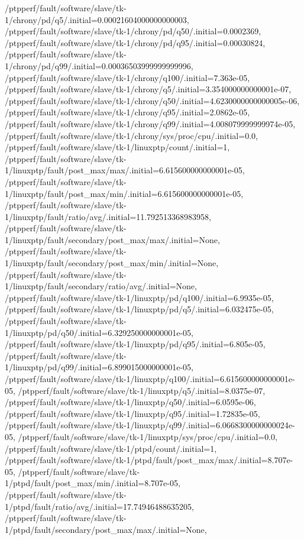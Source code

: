 {    /ptpperf/fault/software/slave/tk-1/chrony/pd/q5/.initial=0.00021604000000000003,
    /ptpperf/fault/software/slave/tk-1/chrony/pd/q50/.initial=0.0002369,
    /ptpperf/fault/software/slave/tk-1/chrony/pd/q95/.initial=0.00030824,
    /ptpperf/fault/software/slave/tk-1/chrony/pd/q99/.initial=0.00036503999999999996,
    /ptpperf/fault/software/slave/tk-1/chrony/q100/.initial=7.363e-05,
    /ptpperf/fault/software/slave/tk-1/chrony/q5/.initial=3.354000000000001e-07,
    /ptpperf/fault/software/slave/tk-1/chrony/q50/.initial=4.6230000000000005e-06,
    /ptpperf/fault/software/slave/tk-1/chrony/q95/.initial=2.0862e-05,
    /ptpperf/fault/software/slave/tk-1/chrony/q99/.initial=4.008079999999974e-05,
    /ptpperf/fault/software/slave/tk-1/chrony/sys/proc/cpu/.initial=0.0,
    /ptpperf/fault/software/slave/tk-1/linuxptp/count/.initial=1,
    /ptpperf/fault/software/slave/tk-1/linuxptp/fault/post_max/max/.initial=6.615600000000001e-05,
    /ptpperf/fault/software/slave/tk-1/linuxptp/fault/post_max/min/.initial=6.615600000000001e-05,
    /ptpperf/fault/software/slave/tk-1/linuxptp/fault/ratio/avg/.initial=11.792513368983958,
    /ptpperf/fault/software/slave/tk-1/linuxptp/fault/secondary/post_max/max/.initial=None,
    /ptpperf/fault/software/slave/tk-1/linuxptp/fault/secondary/post_max/min/.initial=None,
    /ptpperf/fault/software/slave/tk-1/linuxptp/fault/secondary/ratio/avg/.initial=None,
    /ptpperf/fault/software/slave/tk-1/linuxptp/pd/q100/.initial=6.9935e-05,
    /ptpperf/fault/software/slave/tk-1/linuxptp/pd/q5/.initial=6.032475e-05,
    /ptpperf/fault/software/slave/tk-1/linuxptp/pd/q50/.initial=6.329250000000001e-05,
    /ptpperf/fault/software/slave/tk-1/linuxptp/pd/q95/.initial=6.805e-05,
    /ptpperf/fault/software/slave/tk-1/linuxptp/pd/q99/.initial=6.899015000000001e-05,
    /ptpperf/fault/software/slave/tk-1/linuxptp/q100/.initial=6.615600000000001e-05,
    /ptpperf/fault/software/slave/tk-1/linuxptp/q5/.initial=8.0375e-07,
    /ptpperf/fault/software/slave/tk-1/linuxptp/q50/.initial=6.0595e-06,
    /ptpperf/fault/software/slave/tk-1/linuxptp/q95/.initial=1.72835e-05,
    /ptpperf/fault/software/slave/tk-1/linuxptp/q99/.initial=6.0668300000000024e-05,
    /ptpperf/fault/software/slave/tk-1/linuxptp/sys/proc/cpu/.initial=0.0,
    /ptpperf/fault/software/slave/tk-1/ptpd/count/.initial=1,
    /ptpperf/fault/software/slave/tk-1/ptpd/fault/post_max/max/.initial=8.707e-05,
    /ptpperf/fault/software/slave/tk-1/ptpd/fault/post_max/min/.initial=8.707e-05,
    /ptpperf/fault/software/slave/tk-1/ptpd/fault/ratio/avg/.initial=17.74946488635205,
    /ptpperf/fault/software/slave/tk-1/ptpd/fault/secondary/post_max/max/.initial=None,
}
